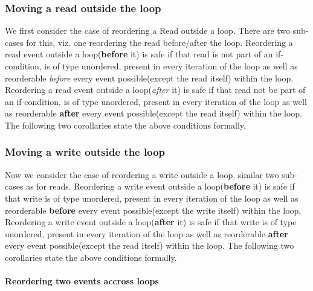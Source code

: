             \subsubsection{Moving a read outside the loop}
                We first consider the case of reordering a Read outside a loop. 
                There are two sub-cases for this, viz. one reordering the read before/after the loop.
                Reordering a read event outside a loop(\textbf{before} it) is safe if that read is not part of an if-condition, is of type unordered,  present in every iteration of the loop as well as reorderable \textit{before} every event possible(except the read itself) within the loop. 
                Reordering a read event outside a loop(\textit{after} it) is safe if that read not be part of an if-condition, is of type unordered, present in every iteration of the loop as well as reorderable \textbf{after} every event possible(except the read itself) within the loop. 
                The following two corollaries state the above conditions formally.

                            

            \subsubsection{Moving a write outside the loop}
                Now we consider the case of reordering a write outside a loop, similar two sub-cases as for reads.     
                Reordering a write event outside a loop(\textbf{before} it) is safe if that write is of type unordered, present in every iteration of the loop as well as reorderable \textbf{before} every event possible(except the write itself) within the loop. 
                Reordering a write event outside a loop(\textbf{after} it) is safe if that write is of type unordered, present in every iteration of the loop as well as reorderable \textbf{after} every event possible(except the read itself) within the loop.      
                The following two corollaries state the above conditions formally.

                   

            \paragraph{Reordering two events accross loops} 
            
